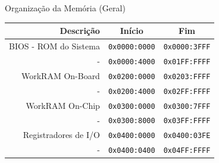 \documentclass{beamer}
\begin{document}
\begin{darkframes}
    \begin{frame}{Organização da Memória (Geral)}
        \begin{center}
            \begin{tabular}{|r|c|c|}
                \hline
                Descrição             & Início               & Fim \\\hline
                BIOS - ROM do Sistema & \texttt{0x0000:0000} & \texttt{0x0000:3FFF} \\\hline
                -                     & \texttt{0x0000:4000} & \texttt{0x01FF:FFFF} \\\hline
                WorkRAM On-Board      & \texttt{0x0200:0000} & \texttt{0x0203:FFFF} \\\hline
                -                     & \texttt{0x0200:4000} & \texttt{0x02FF:FFFF} \\\hline
                WorkRAM On-Chip       & \texttt{0x0300:0000} & \texttt{0x0300:7FFF} \\\hline
                -                     & \texttt{0x0300:8000} & \texttt{0x03FF:FFFF} \\\hline
                Registradores de I/O  & \texttt{0x0400:0000} & \texttt{0x0400:03FE} \\\hline
                -                     & \texttt{0x0400:0400} & \texttt{0x04FF:FFFF} \\\hline
            \end{tabular}
        \end{center}
    \end{frame}

\end{darkframes}
\end{document}
